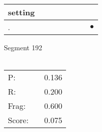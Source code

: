 \documentclass[landscape]{article}
\newcommand{\ssp}{\hspace{2pt}}
\newcommand{\mex}{\cellcolor{g}$\bullet$}
\begin{document}
\begin{tabular}{|l|p{10pt}|p{10pt}|p{10pt}|p{10pt}|p{10pt}|p{10pt}|p{10pt}|}
\hline
\ssp setting \ssp&\hspace{2pt}&\hspace{2pt}&\hspace{2pt}&\hspace{2pt}&\hspace{2pt}&\hspace{2pt}&\hspace{2pt}\\
\hline
\ssp \cellcolor{ref6}. \ssp&\hspace{2pt}&\hspace{2pt}&\hspace{2pt}&\hspace{2pt}&\hspace{2pt}&\hspace{2pt}&\hspace{2pt}\mex\\
\hline
\end{tabular}

\vspace{6pt}
\noindent Segment 192\\\\
\noindent\begin{tabular}{lm{12pt}r}
\hline
P:&&0.136\\
R:&&0.200\\
Frag:&&0.600\\
Score:&&0.075\\
\end{tabular}

\newpage
\end{document}
